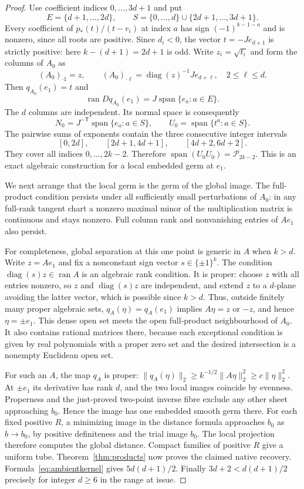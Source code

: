 \documentclass[11pt,reqno]{amsart}
\numberwithin{equation}{section}
\theoremstyle{definition}\newtheorem{definition}[theorem]{Definition}
\theoremstyle{remark}\newtheorem{remark}[theorem]{Remark}
\newcommand{\diag}{\operatorname{diag}}
\newcommand{\ran}{\operatorname{ran}}
\newcommand{\Span}{\operatorname{span}}
\newcommand{\cP}{\mathcal P}
\begin{document}
\begin{proof}
Use coefficient indices $0,\ldots,3d+1$ and put
\[
 E=\{d+1,\ldots,2d\},\qquad
 S=\{0,\ldots,d\}\cup\{2d+1,\ldots,3d+1\}.
\]
Every coefficient of $p_*(t)/(t-r_i)$ at index $a$ has sign $(-1)^{k-1-a}$ and is nonzero, since all roots are positive. Since $d_i<0$, the vector $t=-Je_{d+1}$ is strictly positive: here $k-(d+1)=2d+1$ is odd. Write $z_i=\sqrt{t_i}$ and form the columns of $A_0$ as
\begin{equation}\label{eq:loadconstruct}
 (A_0)_{\cdot1}=z,\qquad
 (A_0)_{\cdot \ell}=\diag(z)^{-1}Je_{d+\ell},\quad 2\le\ell\le d.
\end{equation}
Then $q_{A_0}(e_1)=t$ and
\[
 \ran Dq_{A_0}(e_1)=J\Span\{e_a:a\in E\}.
\]
The $d$ columns are independent. Its normal space is consequently
\[
 N_0=J^{-\mathsf T}\Span\{e_a:a\in S\},\qquad
 U_0=\Span\{t^a:a\in S\}.
\]
The pairwise sums of exponents contain the three consecutive integer intervals
\[
 [0,2d],\qquad [2d+1,4d+1],\qquad [4d+2,6d+2].
\]
They cover all indices $0,\ldots,2k-2$. Therefore $\Span(U_0U_0)=\cP_{2k-2}$. This is an exact algebraic construction for a local embedded germ at $e_1$.

We next arrange that the local germ is the germ of the global image. The full-product condition persists under all sufficiently small perturbations of $A_0$: in any full-rank tangent chart a nonzero maximal minor of the multiplication matrix is continuous and stays nonzero. Full column rank and nonvanishing entries of $Ae_1$ also persist.

For completeness, global separation at this one point is generic in $A$ when $k>d$. Write $z=Ae_1$ and fix a nonconstant sign vector $s\in\{\pm1\}^k$. The condition $\diag(s)z\in\ran A$ is an algebraic rank condition. It is proper: choose $z$ with all entries nonzero, so $z$ and $\diag(s)z$ are independent, and extend $z$ to a $d$-plane avoiding the latter vector, which is possible since $k>d$. Thus, outside finitely many proper algebraic sets, $q_A(\eta)=q_A(e_1)$ implies $A\eta=z$ or $-z$, and hence $\eta=\pm e_1$. This dense open set meets the open full-product neighbourhood of $A_0$. It also contains rational matrices there, because each exceptional condition is given by real polynomials with a proper zero set and the desired intersection is a nonempty Euclidean open set.

For such an $A$, the map $q_A$ is proper: $\|q_A(\eta)\|_2\ge k^{-1/2}\|A\eta\|_2^2\ge c\|\eta\|_2^2$. At $\pm e_1$ its derivative has rank $d$, and the two local images coincide by evenness. Properness and the just-proved two-point inverse fibre exclude any other sheet approaching $b_0$. Hence the image has one embedded smooth germ there. For each fixed positive $R$, a minimizing image in the distance formula approaches $b_0$ as $b\to b_0$, by positive definiteness and the trial image $b_0$. The local projection therefore computes the global distance. Compact families of positive $R$ give a uniform tube. Theorem~\ref{thm:products} now proves the claimed native recovery. Formula~\eqref{eq:ambientkernel} gives $5d(d+1)/2$. Finally $3d+2<d(d+1)/2$ precisely for integer $d\ge6$ in the range at issue.
\end{proof}
\end{document}
